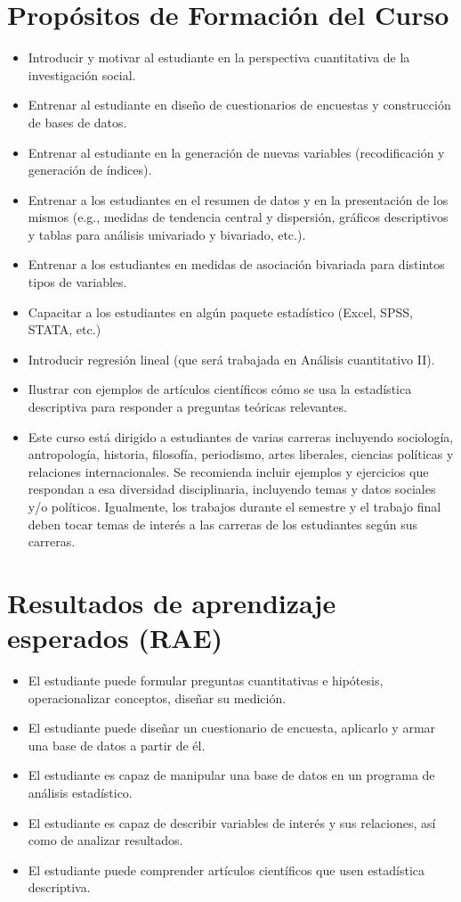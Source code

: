 \documentclass[letterpaper]{article}
\begin{document}
\section{Propósitos de Formación del Curso}
\begin{itemize}
\item	Introducir y motivar al estudiante en la perspectiva cuantitativa de la investigación social. 
\item	Entrenar al estudiante en diseño de cuestionarios de encuestas y construcción de bases de datos. 
\item	Entrenar al estudiante en la generación de nuevas variables (recodificación y generación de índices).
\item	Entrenar a los estudiantes en el resumen de datos y en la presentación de los mismos (e.g., medidas de tendencia central y dispersión, gráficos descriptivos y tablas para análisis univariado y bivariado, etc.).
\item	Entrenar a los estudiantes en medidas de asociación bivariada para distintos tipos de variables. 
\item	Capacitar a los estudiantes en algún paquete estadístico (Excel, SPSS, STATA, etc.)
\item	Introducir regresión lineal (que será trabajada en Análisis cuantitativo II). 
\item	Ilustrar con ejemplos de artículos científicos cómo se usa la estadística descriptiva para responder a preguntas teóricas relevantes. 
\item	Este curso está dirigido a estudiantes de varias carreras incluyendo sociología, antropología, historia, filosofía, periodismo, artes liberales, ciencias políticas y relaciones internacionales. Se recomienda incluir ejemplos y ejercicios que respondan a esa diversidad disciplinaria, incluyendo temas y datos sociales y/o políticos. Igualmente, los trabajos durante el semestre y el trabajo final deben tocar temas de interés a las carreras de los estudiantes según sus carreras.
\end{itemize}

\section{Resultados de aprendizaje esperados (RAE)}

\begin{itemize}
\item	El estudiante puede formular preguntas cuantitativas e hipótesis, operacionalizar conceptos, diseñar su medición.
\item	El estudiante puede diseñar un cuestionario de encuesta, aplicarlo y armar una base de datos a partir de él.
\item	El estudiante es capaz de manipular una base de datos en un programa de análisis estadístico. 
\item	El estudiante es capaz de describir variables de interés y sus relaciones, así como de analizar resultados. 
\item	El estudiante puede comprender artículos científicos que usen estadística descriptiva. 

\end{itemize}
\end{document}

